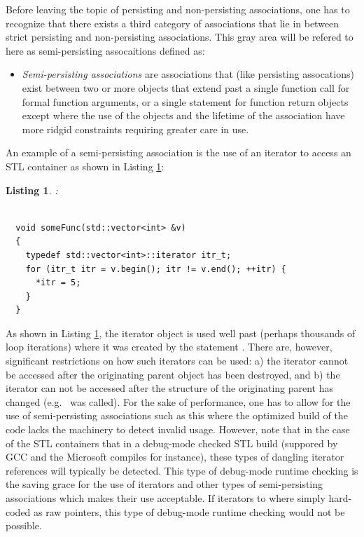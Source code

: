 \documentclass[pdf,ps2pdf,11pt]{SANDreport}
\newtheorem{listing}{Listing}
\begin{document}
Before leaving the topic of persisting and non-persisting associations, one
has to recognize that there exists a third category of associations that lie
in between strict persisting and non-persisting associations.  This gray area
will be refered to here as semi-persisting assocaitions defined as:

\begin{itemize}

{}\item\textit{Semi-persisting associations} are associations that (like
persisting assocations) exist between two or more objects that extend past a
single function call for formal function arguments, or a single statement for
function return objects except where the use of the objects and the lifetime
of the association have more ridgid constraints requiring greater care in use.

\end{itemize}

An example of a semi-persisting association is the use of an iterator to
access an STL container as shown in Listing
{}\ref{listing:SemiPersistingIterators}:


\begin{listing}:\\
\label{listing:SemiPersistingIterators}
{\small\begin{verbatim}

  void someFunc(std::vector<int> &v)
  {
    typedef std::vector<int>::iterator itr_t;
    for (itr_t itr = v.begin(); itr != v.end(); ++itr) {
      *itr = 5;
    }
  }
\end{verbatim}}
\end{listing}


As shown in Listing {}\ref{listing:SemiPersistingIterators}, the iterator
object {} is used well past (perhaps thousands of loop iterations)
where it was created by the statement {}.  There
are, however, significant restrictions on how such iterators can be used: a)
the iterator cannot be accessed after the originating parent object has been
destroyed, and b) the iterator can not be accessed after the structure of the
originating parent has changed (e.g.\ {} was called).  For
the sake of performance, one has to allow for the use of semi-persisting
associations such as this where the optimized build of the code lacks the
machinery to detect invalid usage.  However, note that in the case of the STL
containers that in a debug-mode checked STL build (suppored by GCC and the
Microsoft compiles for instance), these types of dangling iterator references
will typically be detected.  This type of debug-mode runtime checking is the
saving grace for the use of iterators and other types of semi-persisting
associations which makes their use acceptable.  If iterators to
{} where simply hard-coded as raw pointers, this type of
debug-mode runtime checking would not be possible.
\end{document}
